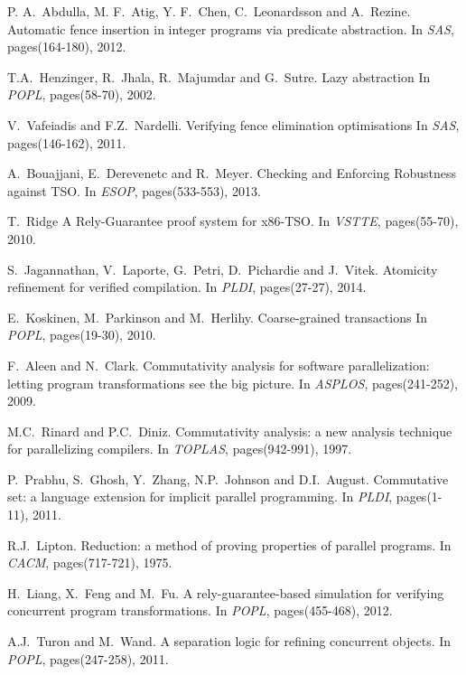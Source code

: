 \documentclass[preprint,9pt]{sigplanconf}
\begin{document}
\begin{thebibliography}{10}
{
P. A.~Abdulla, M. F.~Atig, Y. F.~Chen, C.~Leonardsson and A.~Rezine.
\newblock Automatic fence insertion in integer programs via predicate abstraction.
\newblock In {\em SAS}, pages(164-180), 2012.

T.A.~Henzinger, R.~Jhala, R.~Majumdar and G.~Sutre.
\newblock Lazy abstraction
\newblock In {\em POPL}, pages(58-70), 2002.

V.~Vafeiadis and F.Z.~Nardelli.
\newblock Verifying fence elimination optimisations
\newblock In {\em SAS}, pages(146-162), 2011.

A.~Bouajjani, E.~Derevenetc and R.~Meyer.
\newblock Checking and Enforcing Robustness against TSO.
\newblock In {\em ESOP}, pages(533-553), 2013.

T.~Ridge
\newblock A Rely-Guarantee proof system for x86-TSO.
\newblock In {\em VSTTE}, pages(55-70), 2010.

S.~Jagannathan, V.~Laporte, G.~Petri, D.~Pichardie and J.~Vitek.
\newblock Atomicity refinement for verified compilation.
\newblock In {\em PLDI}, pages(27-27), 2014.

E.~Koskinen, M.~Parkinson and M.~Herlihy.
\newblock Coarse-grained transactions
\newblock In {\em POPL}, pages(19-30), 2010.

F.~Aleen and N.~Clark.
\newblock Commutativity analysis for software parallelization: letting program transformations see the big picture.
\newblock In {\em ASPLOS}, pages(241-252), 2009.

M.C.~Rinard and P.C.~Diniz.
\newblock Commutativity analysis: a new analysis technique for parallelizing compilers.
\newblock In {\em TOPLAS}, pages(942-991), 1997.

P.~Prabhu, S.~Ghosh, Y.~Zhang, N.P.~Johnson and D.I.~August.
\newblock Commutative set: a language extension for implicit parallel programming.
\newblock In {\em PLDI}, pages(1-11), 2011.

R.J.~Lipton.
\newblock Reduction: a method of proving properties of parallel programs.
\newblock In {\em CACM}, pages(717-721), 1975.

H.~Liang, X.~Feng and M.~Fu.
\newblock A rely-guarantee-based simulation for verifying concurrent program transformations.
\newblock In {\em POPL}, pages(455-468), 2012.

A.J.~Turon and M.~Wand.
\newblock A separation logic for refining concurrent objects.
\newblock In {\em POPL}, pages(247-258), 2011.

}
\end{thebibliography}
\end{document}
